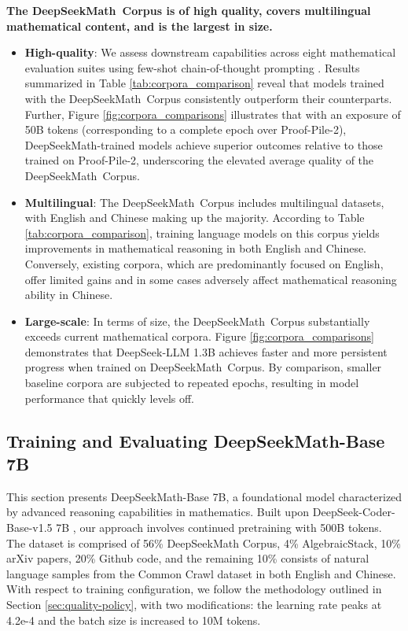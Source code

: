 \begin{itemize}[topsep=0pt]
\textbf{The DeepSeekMath~Corpus is of high quality, covers multilingual mathematical content, and is the largest in size.}

\begin{itemize}[topsep=0pt]
    \item \textbf{High-quality}:
    We assess downstream capabilities across eight mathematical evaluation suites using few-shot chain-of-thought prompting \cite{cot}. Results summarized in Table \ref{tab:corpora_comparison} reveal that models trained with the DeepSeekMath~Corpus consistently outperform their counterparts. Further, Figure \ref{fig:corpora_comparisons} illustrates that with an exposure of 50B tokens (corresponding to a complete epoch over Proof-Pile-2), DeepSeekMath-trained models achieve superior outcomes relative to those trained on Proof-Pile-2, underscoring the elevated average quality of the DeepSeekMath~Corpus.
    \item \textbf{Multilingual}:
    The DeepSeekMath~Corpus includes multilingual datasets, with English and Chinese making up the majority. According to Table \ref{tab:corpora_comparison}, training language models on this corpus yields improvements in mathematical reasoning in both English and Chinese. Conversely, existing corpora, which are predominantly focused on English, offer limited gains and in some cases adversely affect mathematical reasoning ability in Chinese.
    \item \textbf{Large-scale}:
    In terms of size, the DeepSeekMath~Corpus substantially exceeds current mathematical corpora. Figure \ref{fig:corpora_comparisons} demonstrates that DeepSeek-LLM 1.3B achieves faster and more persistent progress when trained on DeepSeekMath~Corpus. By comparison, smaller baseline corpora are subjected to repeated epochs, resulting in model performance that quickly levels off.
\end{itemize}

\subsection{Training and Evaluating DeepSeekMath-Base 7B}

This section presents DeepSeekMath-Base 7B, a foundational model characterized by advanced reasoning capabilities in mathematics. Built upon DeepSeek-Coder-Base-v1.5 7B \citep{deepseek-coder}, our approach involves continued pretraining with 500B tokens. The dataset is comprised of 56\% DeepSeekMath Corpus, 4\% AlgebraicStack, 10\% arXiv papers, 20\% Github code, and the remaining 10\% consists of natural language samples from the Common Crawl dataset in both English and Chinese. With respect to training configuration, we follow the methodology outlined in Section \ref{sec:quality-policy}, with two modifications: the learning rate peaks at 4.2e-4 and the batch size is increased to 10M tokens.


\end{itemize}
